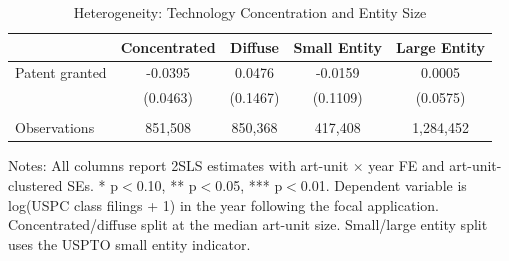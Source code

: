 \begin{table}[H]
\centering
\caption{Heterogeneity: Technology Concentration and Entity Size}
\begin{threeparttable}
\begin{tabular}{lcccc}
\toprule
 & Concentrated & Diffuse & Small Entity & Large Entity \\
\midrule
Patent granted & -0.0395 & 0.0476 & -0.0159 & 0.0005 \\
 & (0.0463) & (0.1467) & (0.1109) & (0.0575) \\
 & \\
Observations & 851,508 & 850,368 & 417,408 & 1,284,452 \\
\bottomrule
\end{tabular}
\begin{tablenotes}[flushleft]
\small
\item Notes: All columns report 2SLS estimates with art-unit $\times$ year FE and art-unit-clustered SEs. * p$<$0.10, ** p$<$0.05, *** p$<$0.01. Dependent variable is log(USPC class filings + 1) in the year following the focal application. Concentrated/diffuse split at the median art-unit size. Small/large entity split uses the USPTO small entity indicator.
\end{tablenotes}
\end{threeparttable}
\label{tab:heterogeneity}
\end{table}

